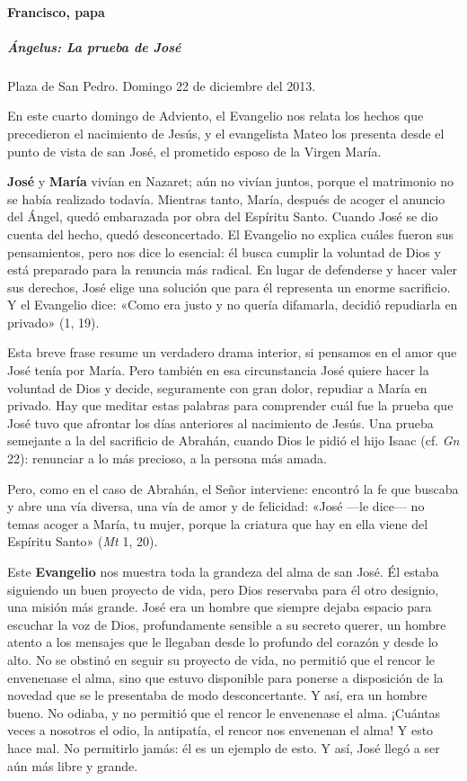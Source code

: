 \documentclass[]{article}
\let\oldparagraph\paragraph
\renewcommand{\paragraph}[1]{\oldparagraph{#1}\mbox{}}
\let\oldsubparagraph\subparagraph
\renewcommand{\subparagraph}[1]{\oldsubparagraph{#1}\mbox{}}
\begin{document}
\paragraph{Francisco, papa}\label{francisco-papa-3}

\subparagraph{Ángelus: La prueba de
José}\label{uxe1ngelus-la-prueba-de-josuxe9}

Plaza de San Pedro. Domingo 22 de diciembre del 2013.

En este cuarto domingo de Adviento, el Evangelio nos relata los hechos
que precedieron el nacimiento de Jesús, y el evangelista Mateo los
presenta desde el punto de vista de san José, el prometido esposo de la
Virgen María.

\textbf{José} y \textbf{María} vivían en Nazaret; aún no vivían juntos,
porque el matrimonio no se había realizado todavía. Mientras tanto,
María, después de acoger el anuncio del Ángel, quedó embarazada por obra
del Espíritu Santo. Cuando José se dio cuenta del hecho, quedó
desconcertado. El Evangelio no explica cuáles fueron sus pensamientos,
pero nos dice lo esencial: él busca cumplir la voluntad de Dios y está
preparado para la renuncia más radical. En lugar de defenderse y hacer
valer sus derechos, José elige una solución que para él representa un
enorme sacrificio. Y el Evangelio dice: «Como era justo y no quería
difamarla, decidió repudiarla en privado» (1, 19).

Esta breve frase resume un verdadero drama interior, si pensamos en el
amor que José tenía por María. Pero también en esa circunstancia José
quiere hacer la voluntad de Dios y decide, seguramente con gran dolor,
repudiar a María en privado. Hay que meditar estas palabras para
comprender cuál fue la prueba que José tuvo que afrontar los días
anteriores al nacimiento de Jesús. Una prueba semejante a la del
sacrificio de Abrahán, cuando Dios le pidió el hijo Isaac (cf. \emph{Gn}
22): renunciar a lo más precioso, a la persona más amada.

Pero, como en el caso de Abrahán, el Señor interviene: encontró la fe
que buscaba y abre una vía diversa, una vía de amor y de felicidad:
«José ---le dice--- no temas acoger a María, tu mujer, porque la
criatura que hay en ella viene del Espíritu Santo» (\emph{Mt} 1, 20).

Este \textbf{Evangelio} nos muestra toda la grandeza del alma de san
José. Él estaba siguiendo un buen proyecto de vida, pero Dios reservaba
para él otro designio, una misión más grande. José era un hombre que
siempre dejaba espacio para escuchar la voz de Dios, profundamente
sensible a su secreto querer, un hombre atento a los mensajes que le
llegaban desde lo profundo del corazón y desde lo alto. No se obstinó en
seguir su proyecto de vida, no permitió que el rencor le envenenase el
alma, sino que estuvo disponible para ponerse a disposición de la
novedad que se le presentaba de modo desconcertante. Y así, era un
hombre bueno. No odiaba, y no permitió que el rencor le envenenase el
alma. ¡Cuántas veces a nosotros el odio, la antipatía, el rencor nos
envenenan el alma! Y esto hace mal. No permitirlo jamás: él es un
ejemplo de esto. Y así, José llegó a ser aún más libre y grande.
\end{document}
